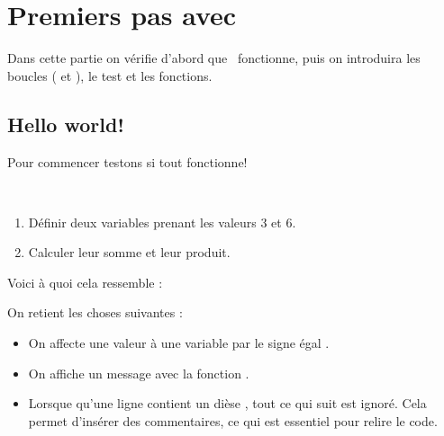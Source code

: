 \documentclass[class=report,crop=false]{standalone}
\begin{document}








\section{Premiers pas avec \Python}

Dans cette partie on vérifie d'abord que \Python\ fonctionne,
puis on introduira les boucles ( et ),
le test  et les fonctions.


\subsection{Hello world!}

Pour commencer testons si tout fonctionne!

\begin{tp}~
\begin{enumerate}
  \item Définir deux variables prenant les valeurs $3$ et $6$.
  \item Calculer leur somme et leur produit.
\end{enumerate}
\end{tp}

Voici à quoi cela ressemble :


On retient les choses suivantes :
\begin{itemize}
  \item On affecte une valeur à une variable par le signe égal \codeinline{=}.
  \item On affiche un message avec la fonction .
  \item Lorsque qu'une ligne contient un dièse \codeinline{#}, tout ce qui suit est ignoré. Cela permet
  d'insérer des commentaires, ce qui est essentiel pour relire le code.
\end{itemize}
\end{document}
